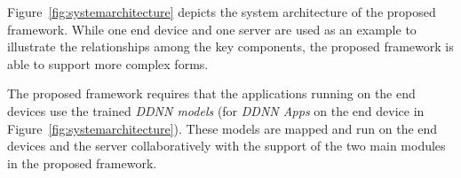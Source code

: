 \documentclass[conference]{IEEEtran}
\def\figurename{Figure}
\begin{document}





\figurename~\ref{fig:systemarchitecture} depicts the system architecture of the proposed framework. While one end device and one server are used as an example to illustrate the relationships among the key components, the proposed framework is able to support more complex forms.

The proposed framework requires that the applications running on the end devices use the trained \emph{DDNN models} (for \emph{DDNN Apps} on the end device in \figurename~\ref{fig:systemarchitecture}). These models are mapped and run on the end devices and the server collaboratively with the support of the two main modules in the proposed framework.
\end{document}
